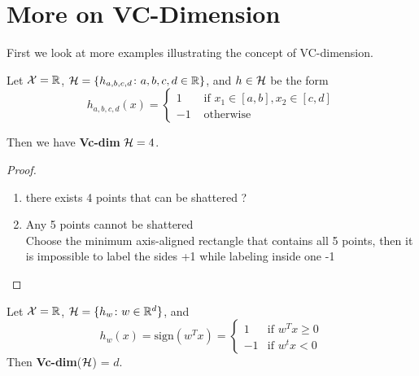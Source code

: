 \section{More on VC-Dimension}
First we look at more examples illustrating the concept of VC-dimension. 

\begin{eg}
    Let \(\mathcal{X} = \mathbb{R}\), \(\mathcal{H} = \{ h_{a,b,c,d} \colon a,b,c,d \in \mathbb{R} \}\),  and \(h \in \mathcal{H}\) be the form 
    \[
        h_{a,b,c,d} (x) = \begin{cases}
            1 & \text{ if } x_1 \in [a,b], x_2 \in [c, d] \\ 
            -1 & \text{ otherwise}
        \end{cases}  
    \]
    
    Then we have \textbf{Vc-dim} \(\mathcal{H} = 4\). 
\end{eg}

\begin{proof}
    \begin{enumerate}
        \item there exists 4 points that can be shattered  \color{red}{exists or for all}? 
        
        \item Any 5 points cannot be shattered  \\ 
        Choose the minimum axis-aligned rectangle that contains all 5 points, then it is impossible 
        to label the sides +1 while labeling inside one -1  
    \end{enumerate}
\end{proof}

\begin{eg}
    Let \(\mathcal{X} = \mathbb{R}\), \(\mathcal{H} = \{h_w \colon w \in \mathbb{R}^d\}\), and 
    \[h_w(x) = \text{sign}(w^Tx)
    = \begin{cases}
        1 &\text{if } w^Tx \geq 0 \\ 
        -1 &\text{if } w^tx < 0 
    \end{cases}\]
    Then \textbf{Vc-dim}(\(\mathcal{H}\)) = \(d\). 
\end{eg}


